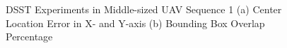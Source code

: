 \documentclass[journal,article,submit,moreauthors,pdftex,10pt,a4paper]{mdpi}
\begin{document}
\begin{figure}[!tb]
	\centering
	\caption{DSST Experiments in Middle-sized UAV Sequence 1 (a) Center Location Error in X- and Y-axis  (b) Bounding Box Overlap Percentage}
\end{figure}
\end{document}
